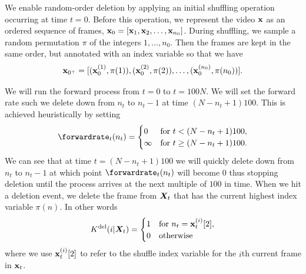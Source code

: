 We enable random-order deletion by applying an initial shuffling operation occurring at time $t=0$. Before this operation, we represent the video ${\mathbf{x}}$ as an ordered sequence of frames, ${\mathbf{x}}_0=[{\mathbf{x}}_1,{\mathbf{x}}_2,\ldots,{\mathbf{x}}_{n_0}]$. During shuffling, we sample a random permutation $\pi$ of the integers $1,\ldots,n_0$. Then the frames are kept in the same order, but annotated with an index variable so that we have 
\begin{equation}
    {\mathbf{x}}_{0^+}=[({\mathbf{x}}_{0}^{(1)}, \pi(1)), ({\mathbf{x}}_{0}^{(2)}, \pi(2)), \ldots, ({\mathbf{x}}^{(n_0)}_{0}, \pi(n_0))].
\end{equation}

We will run the forward process from $t=0$ to $t = 100N$. We will set the forward rate such we delete down from $n_t$ to $n_t - 1$ at time $(N-n_t+1)100$. This is achieved heuristically by setting
\begin{equation}
    \forwardrate_t(n_t) = \begin{cases}
        0 & \text{for } t < (N-n_t+1)100, \\
        \infty & \text{for }  t \geq (N-n_t + 1) 100.
    \end{cases} 
\end{equation}
We can see that at time $t = (N - n_t + 1)100$ we will quickly delete down from $n_t$ to $n_t-1$ at which point $\forwardrate_t(n_t)$ will become $0$ thus stopping deletion until the process arrives at the next multiple of $100$ in time. When we hit a deletion event, we delete the frame from ${\bm{X}}_t$ that has the current highest index variable $\pi(n)$. In other words
\begin{equation}
    K^{\textup{del}}(i | {\bm{X}}_t) = \begin{cases}
        1 & \text{for } n_t = {\mathbf{x}}_{t}^{(i)}[2], \\
        0 & \text{otherwise}
    \end{cases}    
\end{equation}
where we use ${\mathbf{x}}_{t}^{(i)}[2]$ to refer to the shuffle index variable for the $i$th current frame in ${\mathbf{x}}_{t}$.


